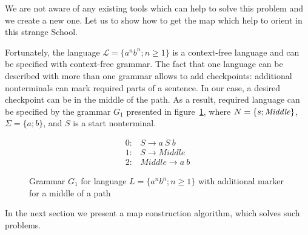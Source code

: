 We are not aware of any existing tools which can help to solve this problem and we create a new one.
Let us to show how to get the map which help to orient in this strange School.

Fortunately, the language $\mathcal{L} = \{a^n b^n; n \geq 1\}$ is a context-free language and can be specified with context-free grammar. 
The fact that one language can be described with more than one grammar allows to add checkpoints: additional nonterminals can mark required parts of a sentence.
In our case, a desired checkpoint can be in the middle of the path.
As a result, required language can be specified by the grammar $G_1$ presented in figure~\ref{grammarG}, where $N = \{s; \text{\textit{Middle}}\}$, $\Sigma = \{a; b\}$, and $S$ is a start nonterminal.

\begin{figure}[h]
   \begin{center}
   \[
\begin{array}{rl}
   0:& S \rightarrow a \ S \ b \\
   1:& S \rightarrow Middle \\
   2:& Middle \rightarrow a \ b
\end{array}
\]

   \caption{Grammar $G_1$ for language $L=\{a^n b^n; n \geq 1\}$ with additional marker for a middle of a path}
   \label{grammarG}        
   \end{center}
\end{figure}

In the next section we present a map construction algorithm,  which solves such problems.
